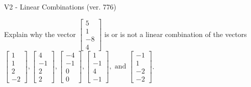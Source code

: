 \begin{exercise}
  \begin{exerciseTitle}V2 - Linear Combinations (ver. 776)\end{exerciseTitle}
  \begin{exerciseStatement}
    Explain why the vector \(\left[\begin{array}{c}
5 \\
1 \\
-8 \\
4
\end{array}\right]\)  is or is not a linear 
	combination of the vectors \(\left[\begin{array}{c}
1 \\
1 \\
2 \\
-2
\end{array}\right] , \left[\begin{array}{c}
4 \\
-1 \\
2 \\
2
\end{array}\right] , \left[\begin{array}{c}
-4 \\
-1 \\
0 \\
0
\end{array}\right] , \left[\begin{array}{c}
1 \\
-1 \\
4 \\
-1
\end{array}\right] , \text{ and } \left[\begin{array}{c}
-1 \\
1 \\
-2 \\
-2
\end{array}\right]\).
	



\end{exerciseStatement}
\end{exercise}
